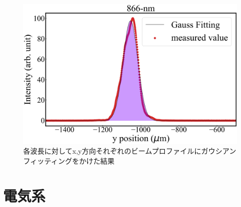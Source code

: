 \begin{figure}[h]
\begin{center}
\begin{minipage}{0.48\linewidth}
\begin{center}
		\includegraphics[width = 0.98\columnwidth]{./experimental_setup/figure/866GaussianFittingYpos.jpg}
	\end{center}
	\end{minipage}
	\caption{各波長に対してx,y方向それぞれのビームプロファイルにガウシアンフィッティングをかけた結果}
	\label{fig:GaussianFitting}
	\end{center}
\end{figure}

\section{電気系}